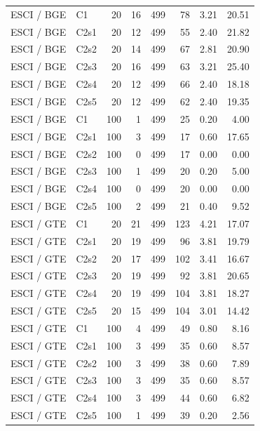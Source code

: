 \begin{longtable}{llrrrrrr}
ESCI / BGE & C1 & 20 & 16 & 499 & 78 & 3.21 & 20.51 \\
ESCI / BGE & C2s1 & 20 & 12 & 499 & 55 & 2.40 & 21.82 \\
ESCI / BGE & C2s2 & 20 & 14 & 499 & 67 & 2.81 & 20.90 \\
ESCI / BGE & C2s3 & 20 & 16 & 499 & 63 & 3.21 & 25.40 \\
ESCI / BGE & C2s4 & 20 & 12 & 499 & 66 & 2.40 & 18.18 \\
ESCI / BGE & C2s5 & 20 & 12 & 499 & 62 & 2.40 & 19.35 \\
ESCI / BGE & C1 & 100 & 1 & 499 & 25 & 0.20 & 4.00 \\
ESCI / BGE & C2s1 & 100 & 3 & 499 & 17 & 0.60 & 17.65 \\
ESCI / BGE & C2s2 & 100 & 0 & 499 & 17 & 0.00 & 0.00 \\
ESCI / BGE & C2s3 & 100 & 1 & 499 & 20 & 0.20 & 5.00 \\
ESCI / BGE & C2s4 & 100 & 0 & 499 & 20 & 0.00 & 0.00 \\
ESCI / BGE & C2s5 & 100 & 2 & 499 & 21 & 0.40 & 9.52 \\
ESCI / GTE & C1 & 20 & 21 & 499 & 123 & 4.21 & 17.07 \\
ESCI / GTE & C2s1 & 20 & 19 & 499 & 96 & 3.81 & 19.79 \\
ESCI / GTE & C2s2 & 20 & 17 & 499 & 102 & 3.41 & 16.67 \\
ESCI / GTE & C2s3 & 20 & 19 & 499 & 92 & 3.81 & 20.65 \\
ESCI / GTE & C2s4 & 20 & 19 & 499 & 104 & 3.81 & 18.27 \\
ESCI / GTE & C2s5 & 20 & 15 & 499 & 104 & 3.01 & 14.42 \\
ESCI / GTE & C1 & 100 & 4 & 499 & 49 & 0.80 & 8.16 \\
ESCI / GTE & C2s1 & 100 & 3 & 499 & 35 & 0.60 & 8.57 \\
ESCI / GTE & C2s2 & 100 & 3 & 499 & 38 & 0.60 & 7.89 \\
ESCI / GTE & C2s3 & 100 & 3 & 499 & 35 & 0.60 & 8.57 \\
ESCI / GTE & C2s4 & 100 & 3 & 499 & 44 & 0.60 & 6.82 \\
ESCI / GTE & C2s5 & 100 & 1 & 499 & 39 & 0.20 & 2.56 \\
\bottomrule
\end{longtable}
